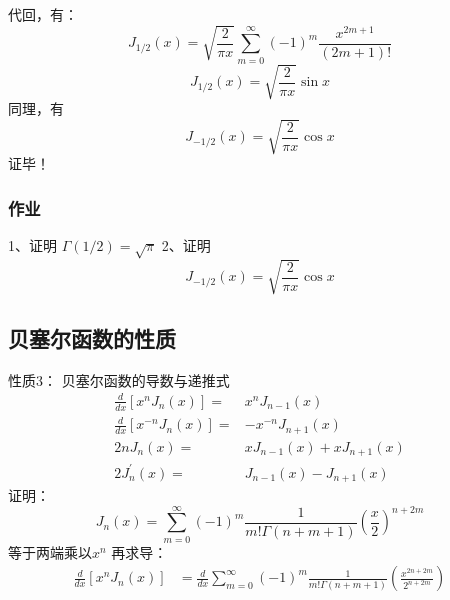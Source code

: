 \begin{frame}
	代回，有：
	\begin{equation*}
		J_{1/2}(x) = \sqrt{\frac{2}{\pi x}} \sum\limits_{m=0}^{\infty} (-1)^m  \frac{x^{2m+1}}{(2m+1)!} 
	\end{equation*}	 
	\begin{equation*}
		J_{1/2}(x) = \sqrt{\frac{2}{\pi x}} \sin x  
	\end{equation*}	 
	同理，有  
	\begin{equation*}
		J_{-1/2}(x) = \sqrt{\frac{2}{\pi x}} \cos x  
	\end{equation*}	 
	\alert{证毕！} 
\end{frame}

\begin{frame}
	\frametitle{作业}
	1、证明 $\Gamma(1/2)=\sqrt{\pi}$
	2、证明
	\begin{equation*}
		J_{-1/2}(x) = \sqrt{\frac{2}{\pi x}} \cos x  
	\end{equation*}
\end{frame}

\subsection{贝塞尔函数的性质}

\begin{frame}
	\alert{性质3：} 贝塞尔函数的导数与递推式 \\
	\begin{equation*}
		\begin{split}
			\frac{d}{d x}\left[x^{n} J_{n}(x)\right]= &x^{n} J_{n-1}(x) \\
			\frac{d}{d x}\left[x^{-n} J_{n}(x)\right]=& -x^{-n} J_{n+1}(x) \\
			2 n J_{n}(x)=&xJ_{n-1}(x)+x J_{n+1}(x) \\
			2 J_{n}^{\prime}(x)=&J_{n-1}(x)-J_{n+1}(x)
		\end{split}
	\end{equation*}		
	\alert{证明：}
	\begin{equation*}
		J_n(x) = \sum\limits_{m=0}^{\infty} (-1)^m  \frac{1}{m! \Gamma(n+m+1) } (\frac{x}{2})^{n+2m} 
	\end{equation*}	 
	等于两端乘以$x^n$ 再求导：
	\begin{equation*}
	\begin{split}
		\frac{d}{dx} [x^n J_n(x)]&= \frac{d}{dx}\sum\limits_{m=0}^{\infty} (-1)^m  
		\frac{1}{m! \Gamma(n+m+1) } (\frac{x^{2n+2m}}{2^{n+2m}})\\	
	\end{split}
	\end{equation*}		
\end{frame}	

